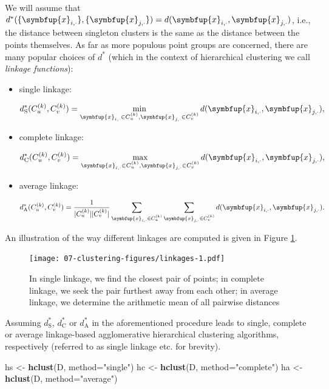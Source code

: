 \documentclass[10pt,b5paper,krantz1]{krantz}
\newenvironment{Shaded}{\begin{snugshade}}{\end{snugshade}}
\newcommand{\DataTypeTok}[1]{\textcolor[rgb]{0.27,0.27,0.27}{#1}}
\newcommand{\KeywordTok}[1]{\textcolor[rgb]{0.27,0.27,0.27}{\textbf{#1}}}
\newcommand{\NormalTok}[1]{#1}
\newcommand{\StringTok}[1]{\textcolor[rgb]{0.5,0.5,0.5}{#1}}
\renewcommand{\mathbf}[1]{\symbfup{#1}}
\begin{document}
We will assume that \(d^*(\{\mathbf{x}_{i,\cdot}\},\{\mathbf{x}_{j,\cdot}\})= d(\mathbf{x}_{i,\cdot},\mathbf{x}_{j,\cdot})\), i.e., the distance between
singleton clusters is the same as the distance between the points themselves.
As far as more populous point groups are concerned, there are many popular
choices of \(d^*\) (which in the context of hierarchical clustering we call
\emph{linkage functions}):

\begin{itemize}
\item
  single linkage:

  \[
    d_\text{S}^*(C_u^{(k)}, C_v^{(k)}) =
    \min_{\mathbf{x}_{i,\cdot}\in C_u^{(k)}, \mathbf{x}_{j,\cdot}\in C_v^{(k)}} d(\mathbf{x}_{i,\cdot},\mathbf{x}_{j,\cdot}),
    \]
\item
  complete linkage:

  \[
    d_\text{C}^*(C_u^{(k)}, C_v^{(k)}) =
    \max_{\mathbf{x}_{i,\cdot}\in C_u^{(k)}, \mathbf{x}_{j,\cdot}\in C_v^{(k)}} d(\mathbf{x}_{i,\cdot},\mathbf{x}_{j,\cdot}),
    \]
\item
  average linkage:

  \[
    d_\text{A}^*(C_u^{(k)}, C_v^{(k)}) =
    \frac{1}{|C_u^{(k)}| |C_v^{(k)}|} \sum_{\mathbf{x}_{i,\cdot}\in C_u^{(k)}}\sum_{\mathbf{x}_{j,\cdot}\in C_v^{(k)}} d(\mathbf{x}_{i,\cdot},\mathbf{x}_{j,\cdot}).
    \]
\end{itemize}

An illustration of the way different linkages are computed
is given in Figure \ref{fig:linkages}.

\begin{figure}
\hypertarget{fig:linkages}{%
\centering
\texttt{[image: 07-clustering-figures/linkages-1.pdf]}
\caption{In single linkage, we find the closest pair of points; in complete linkage, we seek the pair furthest away from each other; in average linkage, we determine the arithmetic mean of all pairwise distances}\label{fig:linkages}
}
\end{figure}

\bigskip

Assuming \(d_\text{S}^*\), \(d_\text{C}^*\) or \(d_\text{A}^*\)
in the aforementioned procedure leads to single, complete or average
linkage-based agglomerative hierarchical clustering algorithms,
respectively
(referred to as single linkage etc. for brevity).

\begin{Shaded}
\begin{Highlighting}[]
\NormalTok{hs <-}\StringTok{ }\KeywordTok{hclust}\NormalTok{(D, }\DataTypeTok{method=}\StringTok{"single"}\NormalTok{)}
\NormalTok{hc <-}\StringTok{ }\KeywordTok{hclust}\NormalTok{(D, }\DataTypeTok{method=}\StringTok{"complete"}\NormalTok{)}
\NormalTok{ha <-}\StringTok{ }\KeywordTok{hclust}\NormalTok{(D, }\DataTypeTok{method=}\StringTok{"average"}\NormalTok{)}
\end{Highlighting}
\end{Shaded}
\end{document}
